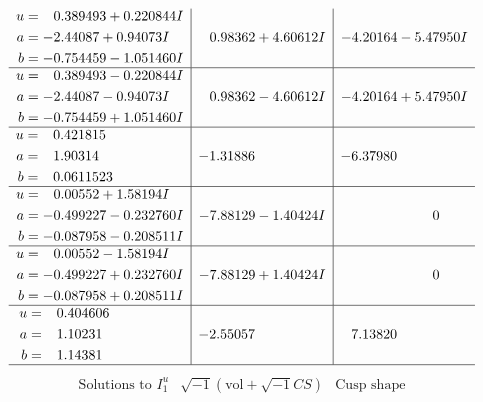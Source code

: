\documentclass[1p]{elsarticle_modified}
\theoremstyle{definition}
\newcommand{\I}{\sqrt{-1}}
\begin{document}
$$\begin{array}{c|c|c}
\begin{aligned}
u &= \phantom{-}0.389493 + 0.220844 I \\
a &= -2.44087 + 0.94073 I \\
b &= -0.754459 - 1.051460 I\end{aligned}
 & \phantom{-}0.98362 + 4.60612 I & -4.20164 - 5.47950 I \\ \hline\begin{aligned}
u &= \phantom{-}0.389493 - 0.220844 I \\
a &= -2.44087 - 0.94073 I \\
b &= -0.754459 + 1.051460 I\end{aligned}
 & \phantom{-}0.98362 - 4.60612 I & -4.20164 + 5.47950 I \\ \hline\begin{aligned}
u &= \phantom{-}0.421815\phantom{ +0.000000I} \\
a &= \phantom{-}1.90314\phantom{ +0.000000I} \\
b &= \phantom{-}0.0611523\phantom{ +0.000000I}\end{aligned}
 & -1.31886\phantom{ +0.000000I} & -6.37980\phantom{ +0.000000I} \\ \hline\begin{aligned}
u &= \phantom{-}0.00552 + 1.58194 I \\
a &= -0.499227 - 0.232760 I \\
b &= -0.087958 - 0.208511 I\end{aligned}
 & -7.88129 - 1.40424 I & \phantom{-0.000000 } 0 \\ \hline\begin{aligned}
u &= \phantom{-}0.00552 - 1.58194 I \\
a &= -0.499227 + 0.232760 I \\
b &= -0.087958 + 0.208511 I\end{aligned}
 & -7.88129 + 1.40424 I & \phantom{-0.000000 } 0 \\ \hline\begin{aligned}
u &= \phantom{-}0.404606\phantom{ +0.000000I} \\
a &= \phantom{-}1.10231\phantom{ +0.000000I} \\
b &= \phantom{-}1.14381\phantom{ +0.000000I}\end{aligned}
 & -2.55057\phantom{ +0.000000I} & \phantom{-}7.13820\phantom{ +0.000000I}\\
 \hline 
 \end{array}$$\newpage$$\begin{array}{c|c|c}  
\text{Solutions to }I^u_{1}& \I (\text{vol} + \sqrt{-1}CS) & \text{Cusp shape}\\

\end{array}$$
\end{document}
